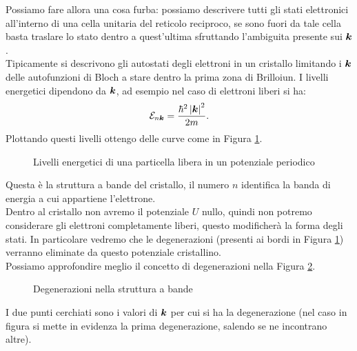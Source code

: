 Possiamo fare allora una cosa furba: possiamo descrivere tutti gli stati elettronici all'interno di una cella unitaria del reticolo reciproco, se sono fuori da tale cella basta traslare lo stato dentro a quest'ultima sfruttando l'ambiguita presente sui $\boldsymbol{k}$.\\
Tipicamente si descrivono gli autostati degli elettroni in un cristallo limitando i $\boldsymbol{k}$ delle autofunzioni di Bloch a stare dentro la prima zona di Brilloiun. I livelli energetici dipendono da $\boldsymbol{k}$, ad esempio nel caso di elettroni liberi si ha:
\[
	\mathcal{E}_{n\boldsymbol{k}}=
	\frac{\hbar^2\left|\boldsymbol{k}\right|^2}{2m}
.\] 
Plottando questi livelli ottengo delle curve come in Figura \ref{fig:livelli-energetici-di-una-particella-libera-in-un-potenziale-periodico}.
\begin{figure}[ht]
    \centering
    \caption{Livelli energetici di una particella libera in un potenziale periodico}
    \label{fig:livelli-energetici-di-una-particella-libera-in-un-potenziale-periodico}
\end{figure}
Questa è la struttura a bande del cristallo, il numero $n$ identifica la banda di energia a cui appartiene l'elettrone. \\
Dentro al cristallo non avremo il potenziale $U$ nullo, quindi non potremo considerare gli elettroni completamente liberi, questo modificherà la forma degli stati. In particolare vedremo che le degenerazioni (presenti ai bordi in Figura \ref{fig:livelli-energetici-di-una-particella-libera-in-un-potenziale-periodico}) verranno eliminate da questo potenziale cristallino.\\
Possiamo approfondire meglio il concetto di degenerazioni nella Figura \ref{fig:degenerazioni-nella-struttura-a-bande}.
\begin{figure}[H]
    \centering
    \caption{Degenerazioni nella struttura a bande}
    \label{fig:degenerazioni-nella-struttura-a-bande}
\end{figure}
\noindent
I due punti cerchiati sono i valori di $\boldsymbol{k}$ per cui si ha la degenerazione (nel caso in figura si mette in evidenza la prima degenerazione, salendo se ne incontrano altre).
